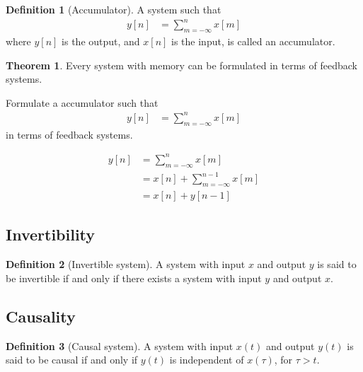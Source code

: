 \documentclass[titlepage, fleqn, a4paper, 12pt, twoside]{article}
\theoremstyle{definition}
\newtheorem{definition}{Definition}
\theoremstyle{theorem}
\newtheorem{theorem}{Theorem}
\begin{document}
\begin{definition}[Accumulator]
	A system such that
	\begin{align*}
		y[n] & = \sum\limits_{m = -\infty}^{n} x[m]
	\end{align*}
	where $y[n]$ is the output, and $x[n]$ is the input, is called an accumulator.
\end{definition}

\begin{theorem}
	Every system with memory can be formulated in terms of feedback systems.
\end{theorem}

\begin{question}
	Formulate a accumulator such that
	\begin{align*}
		y[n] & = \sum\limits_{m = -\infty}^{n} x[m]
	\end{align*}
	in terms of feedback systems.
\end{question}

\begin{solution}
	\begin{align*}
		y[n] & = \sum\limits_{m = -\infty}^{n} x[m]            \\
                     & = x[n] + \sum\limits_{m = -\infty}^{n - 1} x[m] \\
                     & = x[n] + y[n - 1]
	\end{align*}
\end{solution}

\subsection{Invertibility}

\begin{definition}[Invertible system]
	A system with input $x$ and output $y$ is said to be invertible if and only if there exists a system with input $y$ and output $x$.
\end{definition}

\subsection{Causality}

\begin{definition}[Causal system]
	A system with input $x(t)$ and output $y(t)$ is said to be causal if and only if $y(t)$ is independent of $x(\tau)$, for $\tau > t$.
\end{definition}
\end{document}
